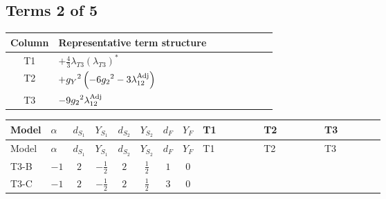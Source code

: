 \documentclass[8pt]{article}
\begin{document}
\begin{landscape}
\subsection*{Terms 2 of 5}
\begin{center}
\begin{tabular}{@{}c >{\raggedright\arraybackslash}p{0.82\linewidth}@{}}
\toprule
Column & Representative term structure \\
\midrule
T1 & \(\displaystyle +\frac{4}{3} {\lambda_{T3}} \left({\lambda_{T3}}\right)^{*}\) \\
\midrule
T2 & \(\displaystyle +{g_Y}^2 \left(-6 {g_2}^2-3 {\lambda_{12}^{\rm Adj}}\right)\) \\
\midrule
T3 & \(\displaystyle -9 {g_2}^2 {\lambda_{12}^{\rm Adj}}\) \\
\midrule
\bottomrule
\end{tabular}
\end{center}
\smallskip
\tiny
\begin{longtable}{@{}llcccccc >{\raggedright\arraybackslash}p{0.21\linewidth} >{\raggedright\arraybackslash}p{0.21\linewidth} >{\raggedright\arraybackslash}p{0.21\linewidth}@{}}
\toprule
Model & $\alpha$ & $d_{S_1}$ & $Y_{S_1}$ & $d_{S_2}$ & $Y_{S_2}$ & $d_F$ & $Y_F$ & T1 & T2 & T3 \\
\midrule
\endfirsthead
\toprule
Model & $\alpha$ & $d_{S_1}$ & $Y_{S_1}$ & $d_{S_2}$ & $Y_{S_2}$ & $d_F$ & $Y_F$ & T1 & T2 & T3 \\
\midrule
\endhead
T3-B & $-1$ & $2$ & $-\frac{1}{2}$ & $2$ & $\frac{1}{2}$ & $1$ & $0$ & \scriptsize\adjustbox{max width=\linewidth}{$\begin{gathered} +\frac{4}{3} {\lambda_{T3}} \left({\lambda_{T3}}\right)^{*}\end{gathered}$} & \scriptsize\adjustbox{max width=\linewidth}{$\begin{gathered} +{g_Y}^2 \left(-6 {g_2}^2-3 {\lambda_{12}^{\rm Adj}}\right)\end{gathered}$} & \scriptsize\adjustbox{max width=\linewidth}{$\begin{gathered} -9 {g_2}^2 {\lambda_{12}^{\rm Adj}}\end{gathered}$} \\
\midrule
T3-C & $-1$ & $2$ & $-\frac{1}{2}$ & $2$ & $\frac{1}{2}$ & $3$ & $0$ & \scriptsize\adjustbox{max width=\linewidth}{$\begin{gathered} +\frac{4}{3} {\lambda_{T3}} \left({\lambda_{T3}}\right)^{*}\end{gathered}$} & \scriptsize\adjustbox{max width=\linewidth}{$\begin{gathered} +{g_Y}^2 \left(-6 {g_2}^2-3 {\lambda_{12}^{\rm Adj}}\right)\end{gathered}$} & \scriptsize\adjustbox{max width=\linewidth}{$\begin{gathered} -9 {g_2}^2 {\lambda_{12}^{\rm Adj}}\end{gathered}$} \\

\end{longtable}
\end{landscape}
\end{document}
